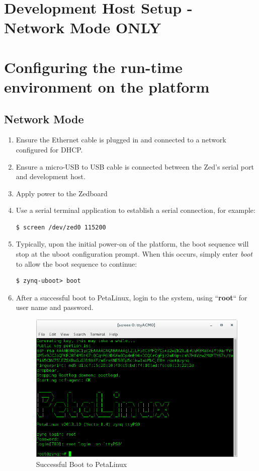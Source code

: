 \pagebreak
\section{Development Host Setup - Network Mode ONLY}

%

\pagebreak
\section{Configuring the run-time environment on the platform}

\subsection{Network Mode}
\begin{enumerate}
\item Ensure the Ethernet cable is plugged in and connected to a network configured for DHCP.
\item Ensure a micro-USB to USB cable is connected between the Zed's serial port and development host.
\item Apply power to the Zedboard
\item Use a serial terminal application to establish a serial connection, for example:

\begin{verbatim}
$ screen /dev/zed0 115200
\end{verbatim}

\item Typically, upon the initial power-on of the platform, the boot sequence will stop at the uboot configuration prompt. When this occurs, simply enter \textit{boot} to allow the boot sequence to continue:
\begin{verbatim}
$ zynq-uboot> boot
\end{verbatim} \medskip

\item After a successful boot to PetaLinux, login to the system, using  ``\textbf{root}`` for user name and password.

\begin{figure}[H]
	\centerline{\includegraphics[scale=0.5]{zed_boot}}
	\caption{Successful Boot to PetaLinux}
	\label{fig:boot1}
\end{figure}


\end{enumerate}
